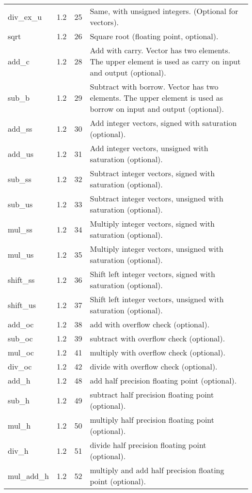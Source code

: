 \documentclass[forwardcom.tex]{subfiles}
\begin{document}
\begin{longtable} {|p{20mm}|p{10mm}|p{8mm}|p{75mm}|}
div\_ex\_u    & 1.2 & 25 & Same, with unsigned integers. (Optional for vectors). \\
sqrt          & 1.2 & 26 & Square root (floating point, optional). \\
add\_c        & 1.2 & 28 & Add with carry. Vector has two elements. The upper element is used as carry on input and output (optional). \\
sub\_b        & 1.2 & 29 & Subtract with borrow. Vector has two elements. The upper element is used as borrow on input and output (optional). \\
add\_ss       & 1.2 & 30 & Add integer vectors, signed with saturation (optional). \\
add\_us       & 1.2 & 31 & Add integer vectors, unsigned with saturation (optional). \\
sub\_ss       & 1.2 & 32 & Subtract integer vectors, signed with saturation (optional). \\
sub\_us       & 1.2 & 33 & Subtract integer vectors, unsigned with saturation (optional). \\
mul\_ss       & 1.2 & 34 & Multiply integer vectors, signed with saturation (optional). \\
mul\_us       & 1.2 & 35 & Multiply integer vectors, unsigned with saturation (optional). \\
shift\_ss       & 1.2 & 36 & Shift left integer vectors, signed with saturation (optional). \\
shift\_us       & 1.2 & 37 & Shift left integer vectors, unsigned with saturation (optional). \\
add\_oc       & 1.2 & 38 & add with overflow check (optional). \\
sub\_oc       & 1.2 & 39 & subtract with overflow check (optional). \\
mul\_oc       & 1.2 & 41 & multiply with overflow check (optional). \\
div\_oc       & 1.2 & 42 & divide with overflow check (optional). \\

add\_h        & 1.2 & 48 & add half precision floating point (optional). \\
sub\_h        & 1.2 & 49 & subtract half precision floating point (optional). \\
mul\_h        & 1.2 & 50 & multiply half precision floating point (optional). \\
div\_h        & 1.2 & 51 & divide half precision floating point (optional). \\
mul\_add\_h   & 1.2 & 52 & multiply and add half precision floating point (optional). \\


\end{longtable}
\end{document}
